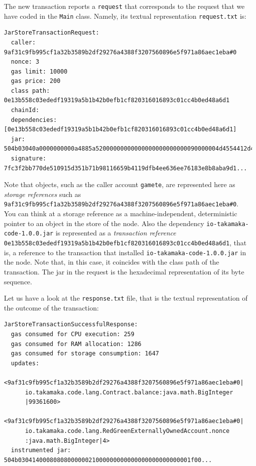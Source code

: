 \documentclass[a4paper,]{book}
\begin{document}
{The new transaction reports a \texttt{request} that corresponds to the
request that we have coded in the \texttt{Main} class. Namely, its
textual representation \texttt{request.txt} is:

\begin{myverbatim}
\begin{verbatim}
JarStoreTransactionRequest:
  caller: 9af31c9fb995cf1a32b3589b2df29276a4388f3207560896e5f971a86aec1eba#0
  nonce: 3
  gas limit: 10000
  gas price: 200
  class path: 0e13b558c03ededf19319a5b1b42b0efb1cf820316016893c01cc4b0ed48a6d1
  chainId: 
  dependencies: [0e13b558c03ededf19319a5b1b42b0efb1cf820316016893c01cc4b0ed48a6d1]
  jar: 504b03040a0000000000a4885a52000000000000000000000000090000004d4554412d49...
  signature: 7fc3f2bb770de510915d351b71b98116659b4119dfb4ee636ee76183e8b8aba9d1...
\end{verbatim}
\end{myverbatim}

Note that objects, such as the caller account \texttt{gamete}, are
represented here as \emph{storage references} such as
\texttt{9af31c9fb995cf1a32b3589b2df29276a4388f3207560896e5f971a86aec1eba\#0}.
You can think at a storage reference as a machine-independent,
deterministic pointer to an object in the store of the node. Also the
dependency \texttt{io-takamaka-code-1.0.0.jar} is represented as a
\emph{transaction reference}
\texttt{0e13b558c03ededf19319a5b1b42b0efb1cf820316016893c01cc4b0ed48a6d1},
that is, a reference to the transaction that installed
\texttt{io-takamaka-code-1.0.0.jar} in the node. Note that, in this
case, it coincides with the class path of the transaction. The jar in
the request is the hexadecimal representation of its byte sequence.

Let us have a look at the \texttt{response.txt} file, that is the
textual representation of the outcome of the transaction:

\begin{myverbatim}
\begin{verbatim}
JarStoreTransactionSuccessfulResponse:
  gas consumed for CPU execution: 259
  gas consumed for RAM allocation: 1286
  gas consumed for storage consumption: 1647
  updates:
    <9af31c9fb995cf1a32b3589b2df29276a4388f3207560896e5f971a86aec1eba#0|
      io.takamaka.code.lang.Contract.balance:java.math.BigInteger
      |99361600>
    <9af31c9fb995cf1a32b3589b2df29276a4388f3207560896e5f971a86aec1eba#0|
      io.takamaka.code.lang.RedGreenExternallyOwnedAccount.nonce
      :java.math.BigInteger|4>
  instrumented jar: 504b0304140008080800000021000000000000000000000000001f00...
\end{verbatim}
\end{myverbatim}

}
\end{document}

